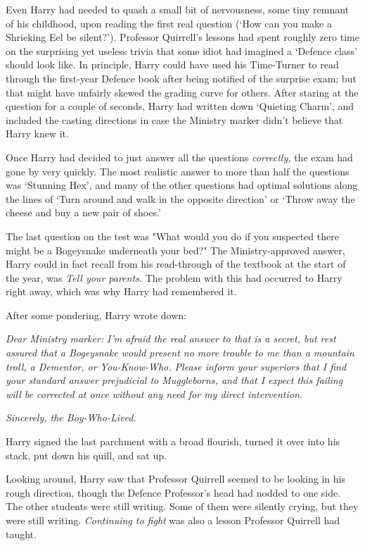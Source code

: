 Even Harry had needed to quash a small bit of nervousness, some tiny remnant of
his childhood, upon reading the first real question (`How can you make a
Shrieking Eel be silent?'). Professor Quirrell's lessons had spent roughly zero
time on the surprising yet useless trivia that some idiot had imagined a
`Defence class' should look like. In principle, Harry could have used his
Time-Turner to read through the first-year Defence book after being notified of
the surprise exam; but that might have unfairly skewed the grading curve for
others. After staring at the question for a couple of seconds, Harry had
written down `Quieting Charm', and included the casting directions in case the
Ministry marker didn't believe that Harry knew it.

Once Harry had decided to just answer all the questions \emph{correctly,} the
exam had gone by very quickly. The most realistic answer to more than half the
questions was `Stunning Hex', and many of the other questions had optimal
solutions along the lines of `Turn around and walk in the opposite direction'
or `Throw away the cheese and buy a new pair of shoes.'

The last question on the test was "What would you do if you suspected there
might be a Bogeysnake underneath your bed?" The Ministry-approved answer, Harry
could in fact recall from his read-through of the textbook at the start of the
year, was \emph{Tell your parents.} The problem with this had occurred to Harry
right away, which was why Harry had remembered it.

After some pondering, Harry wrote down:

\emph{Dear Ministry marker: I'm afraid the real answer to that is a secret, but
rest assured that a Bogeysnake would present no more trouble to me than a
mountain troll, a Dementor, or You-Know-Who. Please inform your superiors that
I find your standard answer prejudicial to Muggleborns, and that I expect this
failing will be corrected at once without any need for my direct intervention.}

\emph{Sincerely, the Boy-Who-Lived.}

Harry signed the last parchment with a broad flourish, turned it over into his
stack, put down his quill, and sat up.

Looking around, Harry saw that Professor Quirrell seemed to be looking in his
rough direction, though the Defence Professor's head had nodded to one side.
The other students were still writing. Some of them were silently crying, but
they were still writing. \emph{Continuing to fight} was also a lesson Professor
Quirrell had taught.

